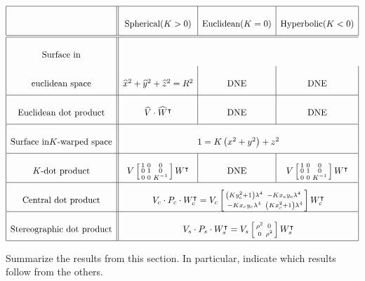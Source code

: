 \documentclass{ximera}
\begin{document}
\[
{\renewcommand{\arraystretch}{2.7}
  \begin{array}{|c||c|c|c|}\hline
    & \text{Spherical} (K>0) & \text{Euclidean} (K=0) & \text{Hyperbolic} (K<0)\\\hline\hline
    \text{Surface in} \\ \text{euclidean space} & \hat{x}^{2}+\hat{y}^{2}+\hat{z}^{2}=R^{2} & \text{DNE}  & \text{DNE} \\\hline
    \text{Euclidean dot product} & \hat{V}\cdot \hat{W}^\transpose & \text{DNE}  & \text{DNE}\\\hline
     \text{Surface in} K \text{-warped space} & \multicolumn{3}{c|}{1=K\left(  x^{2}+y^{2}\right)  +z^{2}}\\\hline
     K\text{-dot product} & V\left[\begin{smallmatrix}1 & 0 & 0\\ 0 & 1 & 0\\ 0 & 0 & K^{-1}\end{smallmatrix}\right] W^\transpose &  \text{DNE} & V\left[\begin{smallmatrix}1 & 0 & 0\\ 0 & 1 & 0\\ 0 & 0 & K^{-1}\end{smallmatrix}\right]W^\transpose\\\hline
     \text{Central dot product} & \multicolumn{3}{c|}{V_c\cdot P_c\cdot W_c^\transpose = V_c\left[\begin{smallmatrix}\left(Ky_c^2+1\right)\lambda^4 & -Kx_{c}y_{c}\lambda^4\\
           -Kx_{c}y_{c}\lambda^4 & \left(Kx_c^2+1\right)\lambda^4\end{smallmatrix}\right] W_c^\transpose}\\\hline
     \text{Stereographic dot product} & \multicolumn{3}{c|}{V_s\cdot P_s\cdot W_s^\transpose = V_s\left[\begin{smallmatrix}\rho^2 & 0\\
    0 & \rho^2 \end{smallmatrix}\right] W_s^\transpose}\\\hline
\end{array}}
\]





\begin{problem}
Summarize the results from this section. In particular, indicate which
results follow from the others.
\begin{freeResponse}
\end{freeResponse}
\end{problem}
\end{document}
